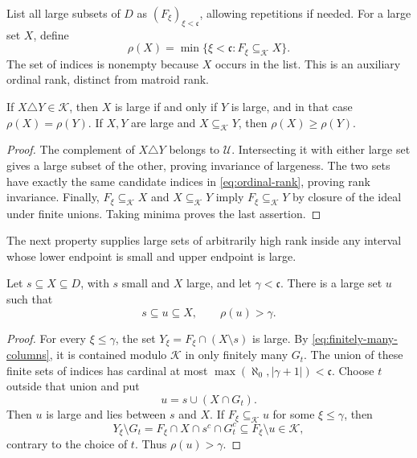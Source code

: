 List all large subsets of $D$ as $(F_\xi)_{\xi<\mathfrak c}$,
allowing repetitions if needed. For a large set $X$, define
\begin{equation}\label{eq:ordinal-rank}
 \rho(X)=\min\{\xi<\mathfrak c:
                     F_\xi\subseteq_{\mathcal K}X\}.
\end{equation}
The set of indices is nonempty because $X$ occurs in the list.
This is an auxiliary ordinal rank, distinct from matroid rank.

\begin{lemma}\label{lem:rank}
If $X\triangle Y\in\mathcal K$, then $X$ is large if and only if $Y$
is large, and in that case $\rho(X)=\rho(Y)$.
If $X,Y$ are large and $X\subseteq_{\mathcal K}Y$, then
$\rho(X)\ge\rho(Y)$.
\end{lemma}

\begin{proof}
The complement of $X\triangle Y$ belongs to $\mathcal U$.
Intersecting it with either large set gives a large subset of the
other, proving invariance of largeness. The two sets have exactly the
same candidate indices in \eqref{eq:ordinal-rank}, proving rank
invariance. Finally, $F_\xi\subseteq_{\mathcal K}X$ and
$X\subseteq_{\mathcal K}Y$ imply
$F_\xi\subseteq_{\mathcal K}Y$ by closure of the ideal under finite
unions. Taking minima proves the last assertion.
\end{proof}

The next property supplies large sets of arbitrarily high rank inside
any interval whose lower endpoint is small and upper endpoint is
large.

\begin{lemma}\label{lem:thinning}
Let $s\subseteq X\subseteq D$, with $s$ small and $X$ large, and let
$\gamma<\mathfrak c$. There is a large set $u$ such that
\[
 s\subseteq u\subseteq X,\qquad \rho(u)>\gamma.
\]
\end{lemma}

\begin{proof}
For every $\xi\le\gamma$, the set
$Y_\xi=F_\xi\cap(X\setminus s)$ is large. By
\eqref{eq:finitely-many-columns}, it is contained modulo
$\mathcal K$ in only finitely many $G_t$.
The union of these finite sets of indices has cardinal at most
$\max(\aleph_0,|\gamma+1|)<\mathfrak c$. Choose $t$ outside that union
and put
\[
 u=s\cup(X\cap G_t).
\]
Then $u$ is large and lies between $s$ and $X$.
If $F_\xi\subseteq_{\mathcal K}u$ for some $\xi\le\gamma$, then
\[
 Y_\xi\setminus G_t
 =F_\xi\cap X\cap s^c\cap G_t^c
 \subseteq F_\xi\setminus u\in\mathcal K,
\]
contrary to the choice of $t$. Thus $\rho(u)>\gamma$.
\end{proof}

